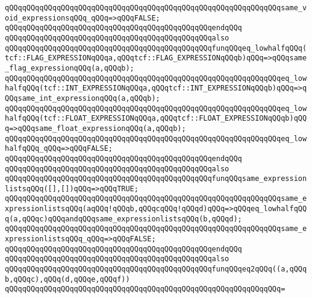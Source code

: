 \verb|qQQqqQQqqQQqqQQqqQQqqQQqqQQqqQQqqQQqqQQqqQQqqQQqqQQqqQQqqQQqqQQqsame_void_expressionsqQQq_qQQq=>qQQqFALSE;|\newline
\verb|qQQqqQQqqQQqqQQqqQQqqQQqqQQqqQQqqQQqqQQqqQQqqQQqendqQQq|\newline
\newline
\verb|qQQqqQQqqQQqqQQqqQQqqQQqqQQqqQQqqQQqqQQqqQQqqQQqalso|\newline
\verb|qQQqqQQqqQQqqQQqqQQqqQQqqQQqqQQqqQQqqQQqqQQqqQQqfunqQQqeq_lowhalfqQQq(tcf::FLAG_EXPRESSIONqQQqa,qQQqtcf::FLAG_EXPRESSIONqQQqb)qQQq=>qQQqsame_flag_expressionqQQq(a,qQQqb);|\newline
\verb|qQQqqQQqqQQqqQQqqQQqqQQqqQQqqQQqqQQqqQQqqQQqqQQqqQQqqQQqqQQqqQQqeq_lowhalfqQQq(tcf::INT_EXPRESSIONqQQqa,qQQqtcf::INT_EXPRESSIONqQQqb)qQQq=>qQQqsame_int_expressionqQQq(a,qQQqb);|\newline
\verb|qQQqqQQqqQQqqQQqqQQqqQQqqQQqqQQqqQQqqQQqqQQqqQQqqQQqqQQqqQQqqQQqeq_lowhalfqQQq(tcf::FLOAT_EXPRESSIONqQQqa,qQQqtcf::FLOAT_EXPRESSIONqQQqb)qQQq=>qQQqsame_float_expressionqQQq(a,qQQqb);|\newline
\verb|qQQqqQQqqQQqqQQqqQQqqQQqqQQqqQQqqQQqqQQqqQQqqQQqqQQqqQQqqQQqqQQqeq_lowhalfqQQq_qQQq=>qQQqFALSE;|\newline
\verb|qQQqqQQqqQQqqQQqqQQqqQQqqQQqqQQqqQQqqQQqqQQqqQQqendqQQq|\newline
\newline
\verb|qQQqqQQqqQQqqQQqqQQqqQQqqQQqqQQqqQQqqQQqqQQqqQQqalso|\newline
\verb|qQQqqQQqqQQqqQQqqQQqqQQqqQQqqQQqqQQqqQQqqQQqqQQqfunqQQqsame_expressionlistsqQQq([],[])qQQq=>qQQqTRUE;|\newline
\verb|qQQqqQQqqQQqqQQqqQQqqQQqqQQqqQQqqQQqqQQqqQQqqQQqqQQqqQQqqQQqqQQqsame_expressionlistsqQQq(aqQQq!qQQqb,qQQqcqQQq!qQQqd)qQQq=>qQQqeq_lowhalfqQQq(a,qQQqc)qQQqandqQQqsame_expressionlistsqQQq(b,qQQqd);|\newline
\verb|qQQqqQQqqQQqqQQqqQQqqQQqqQQqqQQqqQQqqQQqqQQqqQQqqQQqqQQqqQQqqQQqsame_expressionlistsqQQq_qQQq=>qQQqFALSE;|\newline
\verb|qQQqqQQqqQQqqQQqqQQqqQQqqQQqqQQqqQQqqQQqqQQqqQQqendqQQq|\newline
\newline
\verb|qQQqqQQqqQQqqQQqqQQqqQQqqQQqqQQqqQQqqQQqqQQqqQQqalso|\newline
\verb|qQQqqQQqqQQqqQQqqQQqqQQqqQQqqQQqqQQqqQQqqQQqqQQqfunqQQqeq2qQQq((a,qQQqb,qQQqc),qQQq(d,qQQqe,qQQqf))|\newline
\verb|qQQqqQQqqQQqqQQqqQQqqQQqqQQqqQQqqQQqqQQqqQQqqQQqqQQqqQQqqQQqqQQq=|\newline
